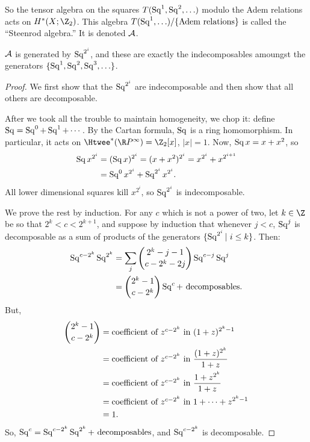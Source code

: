 So the tensor algebra on the squares $T(\operatorname{Sq}^1, \operatorname{Sq}^2, \ldots)$ modulo the Adem relations acts on $H^*(X; \Z_2)$.  This algebra $T(\operatorname{Sq}^1, \ldots) / \{\hbox{Adem relations}\}$ is called the ``Steenrod algebra.''  It is denoted $\mathcal{A}$.
\begin{lem}
$\mathcal{A}$ is generated by $\operatorname{Sq}^{2^i}$, and these are exactly the indecomposables amoungst the generators $\{\operatorname{Sq}^1,\operatorname{Sq}^2,\operatorname{Sq}^3,\ldots\}$.
\end{lem}
\begin{proof}
We first show that the $\operatorname{Sq}^{2^i}$ are indecomposable and then show that all others are decomposable.

After we took all the trouble to maintain homogeneity, we chop it: define $\operatorname{Sq} = \operatorname{Sq}^0 + \operatorname{Sq}^1 + \cdots$.  By the Cartan formula, $\operatorname{Sq}$ is a ring homomorphism.  In particular, it acts on $\Htwee^* (\RP^\infty) = \Z_2[x]$, $|x| = 1$.  Now, $\operatorname{Sq} x = x + x^2$, so
\begin{align*}
\operatorname{Sq} x^{2^i} & = (\operatorname{Sq} x)^{2^i} = (x + x^2)^{2^i} = x^{2^i} + x^{2^{i+1}} \\
& = \operatorname{Sq}^0 x^{2^i} + \operatorname{Sq}^{2^i} x^{2^i}.
\end{align*}
All lower dimensional squares kill $x^{2^i}$, so $\operatorname{Sq}^{2^i}$ is indecomposable.

We prove the rest by induction. For any $c$ which is not a power of two, let $k \in \Z$ be so that $2^k < c < 2^{k+1}$, and suppose by induction that whenever $j<c$, $\operatorname{Sq}^j$ is decomposable as a sum of products of the generators $\{\Sq^{2^i}|\ i\leq k\}$.  Then:
\begin{align*}
\operatorname{Sq}^{c-2^k} \operatorname{Sq}^{2^k} & = \sum_j \binom{2^k - j - 1}{c-2^k-2j} \operatorname{Sq}^{c-j}\operatorname{Sq}^j \\
& = \binom{2^k - 1}{c-2^k} \operatorname{Sq}^c + \mathrm{\ decomposables}.
\end{align*}
But,
\begin{align*}
\binom{2^k-1}{c-2^k} & = \hbox{coefficient of $z^{c-2^k}$ in}\ (1 + z)^{2^k-1} \\
& = \hbox{coefficient of $z^{c-2^k}$ in}\ \frac{(1+z)^{2^k}}{1+z} \\
& = \hbox{coefficient of $z^{c-2^k}$ in}\ \frac{1 + z^{2^k}}{1+z} \\
& = \hbox{coefficient of $z^{c-2^k}$ in}\ 1 + \cdots + z^{2^k - 1} \\
& = 1.
\end{align*}
So, $\operatorname{Sq}^c = \operatorname{Sq}^{c-2^k} \operatorname{Sq}^{2^k} + \mathrm{\ decomposables}$, and $\operatorname{Sq}^{c - 2^k}$ is decomposable.
\end{proof}

